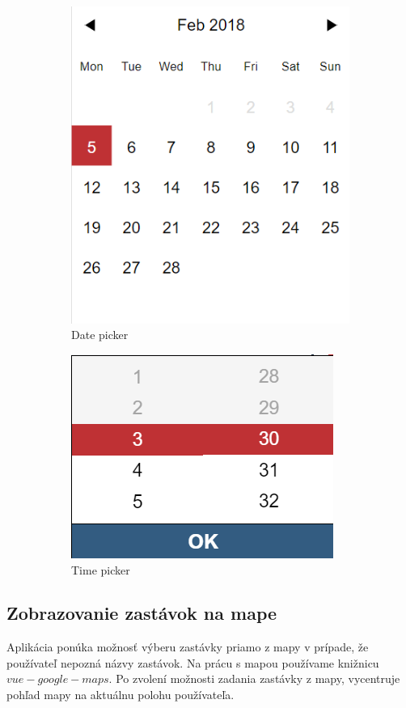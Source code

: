 \begin{figure}[H]
\centering
	\begin{subfigure}[b]{0.48\textwidth}
		\centering
 		\includegraphics[width=0.6\linewidth]{images/date-picker}
		\caption{Date picker}
		\label{fig:date-picker}
	\end{subfigure}
	\begin{subfigure}[b]{0.48\textwidth}
		\centering
		\includegraphics[width=0.6\linewidth]{images/time-picker}
			\caption{Time picker}
		\label{fig:time-picker}
	\end{subfigure}
	\caption[Date picker a Time picker]{}
\end{figure}


\subsection{Zobrazovanie zastávok na mape}
Aplikácia ponúka možnosť výberu zastávky priamo z mapy v prípade, že používateľ nepozná názvy zastávok. Na prácu s mapou používame knižnicu $vue-google-maps$. Po zvolení možnosti zadania zastávky z mapy, vycentruje pohľad mapy na aktuálnu polohu používateľa. 

